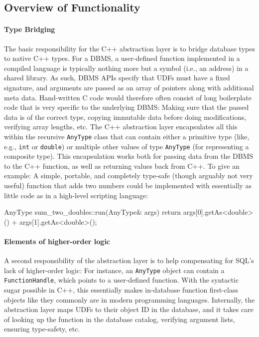 \subsection{Overview of Functionality} \label{sec:C++AL:Classes}

\paragraph{Type Bridging}

The basic responsibility for the C++ abstraction layer is to bridge database types to native C++ types. For a DBMS, a user-defined function implemented in a compiled language is typically nothing more but a symbol (i.e., an address) in a shared library. As such, DBMS APIs specify that UDFs must have a fixed signature, and arguments are passed as an array of pointers along with additional meta data. Hand-written C code would therefore often consist of long boilerplate code that is very specific to the underlying DBMS: Making sure that the passed data is of the correct type, copying immutable data before doing modifications, verifying array lengths, etc. The C++ abstraction layer encapsulates all this within the recursive \texttt{AnyType} class that can contain either a primitive type (like, e.g., \texttt{int} or \texttt{double}) or multiple other values of type \texttt{AnyType} (for representing a composite type). This encapsulation works both for passing data from the DBMS to the C++ function, as well as returning values back from C++. To give an example: A simple, portable, and completely type-safe (though arguably not very useful) function that adds two numbers could be implemented with essentially as little code as in a high-level scripting language:
\begin{cpp}
    AnyType
    sum_two_doubles::run(AnyType& args) {
        return args[0].getAs<double>()
             + args[1].getAs<double>();
    }
\end{cpp}

\paragraph{Elements of higher-order logic}

A second responsibility of the abstraction layer is to help compensating for SQL's lack of higher-order logic: For instance, an \texttt{AnyType} object can contain a \texttt{FunctionHandle}, which points to a user-defined function. With the syntactic sugar possible in C++, this essentially makes in-database function first-class objects like they commonly are in modern programming languages. Internally, the abstraction layer maps UDFs to their object ID in the database, and it takes care of looking up the function in the database catalog, verifying argument lists, ensuring type-safety, etc.

